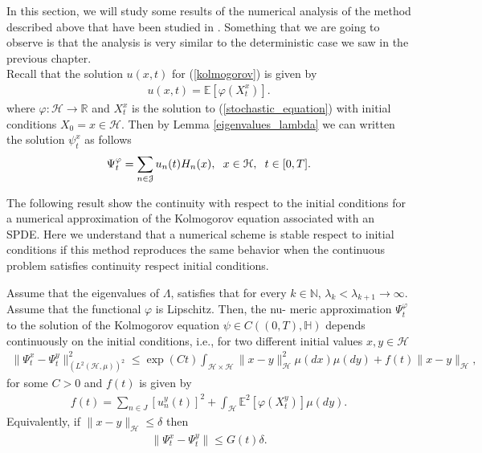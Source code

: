     In this section, we will study some results of the numerical analysis of the method described above that have been studied in \cite{Delgado2019}. Something that we are going to observe is that the analysis is very similar to the deterministic case we saw in the previous chapter. \\
    
    \noindent Recall that the solution $u(x, t)$ for (\ref{kolmogorov}) is given by
    \begin{align*}
    	u(x, t) = \mathbb{E} \left[ \varphi (X^x_t) \right]. 
    \end{align*}
    where $\varphi: \mathcal{H} \rightarrow \mathbb{R}$ and $X^x_t$ is the solution to (\ref{stochastic_equation}) with initial conditions $X_0 = x \in \mathcal{H}$. Then by Lemma \ref{eigenvalues_lambda} we can written the solution $\psi^x_t$ as follows 
    \begin{align*}
    	\Psi^{\varphi}_t = \displaystyle \sum _{n \in \mathcal{J}} u_n (t) H_n (x), \hspace{2mm} x \in \mathcal{H}, \hspace{2mm} t \in [0, T].
    \end{align*}
	
	The following result show the continuity with respect to the initial conditions for a numerical approximation of the Kolmogorov equation associated with an SPDE. Here we understand that a numerical scheme is stable respect to initial conditions if this method reproduces the same behavior when the continuous problem satisfies continuity respect initial conditions.
	
	\begin{teor}
		Assume that the eigenvalues of $\Lambda$, satisfies that for every $k \in \mathbb{N}$, $\lambda_k < \lambda_{k+1} \rightarrow \infty$. Assume that the functional $\varphi$ is Lipschitz. Then, the nu-
		meric approximation $\Psi^{\varphi}_t$ to the solution of the Kolmogorov equation $\psi \in C((0, T), \mathbb{H})$ depends continuously on the initial conditions, i.e., for two different initial values $x, y \in \mathcal{H}$
		\begin{align*}
			\| \Psi^x_t - \Psi^y_t \|^2_{\left( L^2 (\mathcal{H}, \mu)\right)^2} \leq \exp(Ct) \displaystyle \int_{\mathcal{H} \times \mathcal{H}} \|x - y \|^2_{\mathcal{H}} \mu (dx) \mu (dy) + f(t) \|x - y\|_{\mathcal{H}},
		\end{align*}
		for some $C>0$ and $f(t)$ is given by
		\begin{align*}
			f(t) = \displaystyle \sum_{n \in J} \left[u^y_n (t)\right]^2 + \int_{\mathcal{H}} \mathbb{E}^2 \left[\varphi (X^y_t)\right] \mu (dy).
		\end{align*}	
		Equivalently, if $\|x - y\|_{\mathcal{H}} \leq \delta$ then
		\begin{align*}
			\| \Psi^x_t - \Psi^y_t \| \leq G(t) \delta.
		\end{align*} 
	\end{teor}
	
